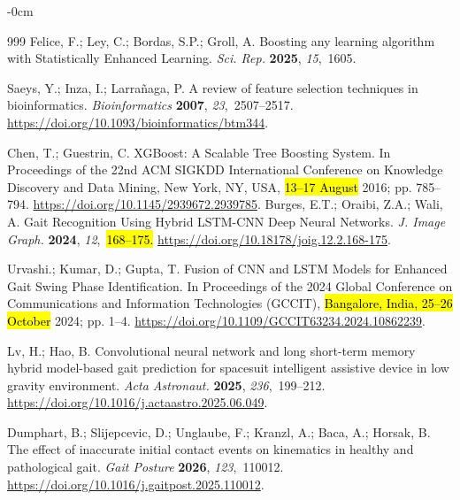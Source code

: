 \documentclass[sensors,article,accept,pdftex,moreauthors]{Definitions/mdpi}
\begin{document}
\begin{adjustwidth}{-\extralength}{0cm}
\begin{thebibliography}{999}
Felice, F.; Ley, C.; Bordas, S.P.; Groll, A.
 Boosting any learning algorithm with {Statistically Enhanced
  Learning}.
 {\em Sci. Rep.} {\bf 2025}, {\em 15},~1605.

Saeys, Y.; Inza, I.; Larrañaga, P.
 A review of feature selection techniques in bioinformatics.
 {\em Bioinformatics} {\bf 2007}, {\em 23},~2507--2517.
 {\url{https://doi.org/10.1093/bioinformatics/btm344}}.

Chen, T.; Guestrin, C.
 XGBoost: A Scalable Tree Boosting System.
 In Proceedings of the 22nd ACM SIGKDD
  International Conference on Knowledge Discovery and Data Mining, New York,
  NY, USA, \hl{13--17 August} 2016; pp. 785–794. {\url{https://doi.org/10.1145/2939672.2939785}}.
Burges, E.T.; Oraibi, Z.A.; Wali, A.
 Gait Recognition Using Hybrid {LSTM-CNN} Deep Neural Networks.
 {\em J. Image Graph.} {\bf 2024}, {\em 12},~\hl{168--175.} %
 {\url{https://doi.org/10.18178/joig.12.2.168-175}}.

Urvashi.; Kumar, D.; Gupta, T.
 Fusion of CNN and LSTM Models for Enhanced Gait Swing Phase
  Identification.
 In Proceedings of the 2024 Global Conference on Communications and
  Information Technologies (GCCIT), \hl{Bangalore, India, 25--26 October} 2024; pp. 1--4.
{\url{https://doi.org/10.1109/GCCIT63234.2024.10862239}}.

Lv, H.; Hao, B.
 Convolutional neural network and long short-term memory hybrid
  model-based gait prediction for spacesuit intelligent assistive device in low
  gravity environment.
 {\em Acta Astronaut.} {\bf 2025}, {\em 236},~199--212.
  {\url{https://doi.org/10.1016/j.actaastro.2025.06.049}}.

Dumphart, B.; Slijepcevic, D.; Unglaube, F.; Kranzl, A.; Baca, A.; Horsak, B.
 The effect of inaccurate initial contact events on kinematics in
  healthy and pathological gait.
 {\em Gait Posture} {\bf 2026}, {\em 123},~110012.
  {\url{https://doi.org/10.1016/j.gaitpost.2025.110012}}.


\end{thebibliography}
\end{adjustwidth}
\end{document}
